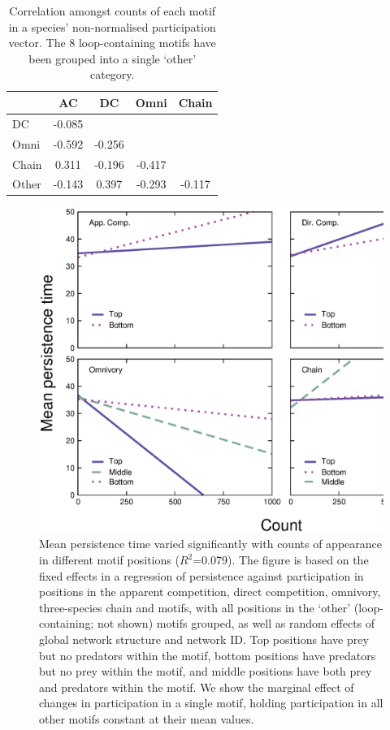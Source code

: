 \documentclass[12pt]{article}
\begin{document}
\begin{spacing}{2.0}
		\begin{table}[hb!]
    		\caption{Correlation amongst counts of each motif in a species' non-normalised participation vector. The 8 loop-containing motifs have been grouped into a single `other' category.}
    		\label{tab:count_correlations}
    		\begin{tabular}{l | c c c c}
    			& AC & DC & Omni & Chain \\
    		\hline
    		DC    & -0.085 &        &        &        \\   
    		Omni  & -0.592 & -0.256 &        &        \\
    		Chain &  0.311 & -0.196 & -0.417 &        \\
    		Other & -0.143 &  0.397 & -0.293 & -0.117 \\
    		\hline
    		\end{tabular}
    		\end{table}

        \begin{figure}[ht!]
            \centering
            \includegraphics[width=\textwidth]{figures/roles/persistence_vs_positions_count.eps}
            \caption{Mean persistence time varied significantly with counts of appearance in different motif positions ($R^2$=0.079). The figure is based on the fixed effects in a regression of persistence against participation in positions in the apparent competition, direct competition, omnivory, three-species chain and motifs, with all positions in the `other' (loop-containing; not shown) motifs grouped, as well as random effects of global network structure and network ID. Top positions have prey but no predators within the motif, bottom positions have predators but no prey within the motif, and middle positions have both prey and predators within the motif. We show the marginal effect of changes in participation in a single motif, holding participation in all other motifs constant at their mean values.}
            \label{fig:persistence_positions_count}
        \end{figure}



\end{spacing}
\end{document}

